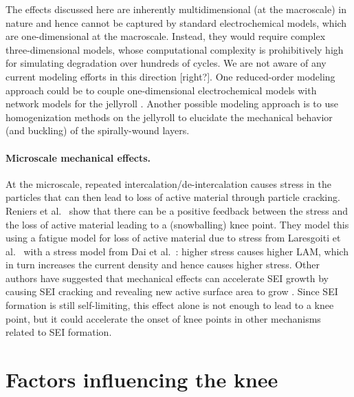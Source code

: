 \documentclass{article}
\newcommand{\pbox}[1]{{
\fbox{
\parbox{0.8\textwidth}{  \fbox{$\triangleright$\textcolor{blue}{\textbf{From Peter}:}} 
#1
}}}}
\begin{document}
The effects discussed here are inherently multidimensional (at the macroscale) in nature and hence cannot be captured by standard electrochemical models, which are one-dimensional at the macroscale. Instead, they would require complex three-dimensional models, whose computational complexity is prohibitively high for simulating degradation over hundreds of cycles. We are not aware of any current modeling efforts in this direction [right?]. One reduced-order modeling approach could be to couple one-dimensional electrochemical models with network models for the jellyroll \cite{tranter_probing_2020}.  Another possible modeling approach is to use homogenization methods on the jellyroll \cite{psaltis_homogenisation_2020} to elucidate the mechanical behavior (and buckling) of the spirally-wound layers.

\paragraph{Microscale mechanical effects.}

\pbox{
Add covering layer stuff
}

At the microscale, repeated intercalation/de-intercalation causes stress in the particles that can then lead to loss of active material through particle cracking.
Reniers et al.~\cite{reniers_review_2019} show that there can be a positive feedback between the stress and the loss of active material leading to a (snowballing) knee point. They model this using a fatigue model for loss of active material due to stress from Laresgoiti et al.~\cite{laresgoiti_modeling_2015} with a stress model from Dai et al.~\cite{dai_simulation_2014}: higher stress causes higher LAM, which in turn increases the current density and hence causes higher stress.
Other authors have suggested that mechanical effects can accelerate SEI growth by causing SEI cracking and revealing new active surface area to grow \cite{kupper_end--life_2018,louli_operando_2019}. Since SEI formation is still self-limiting, this effect alone is not enough to lead to a knee point, but it could accelerate the onset of knee points in other mechanisms related to SEI formation.


\section{Factors influencing the knee}
\end{document}
